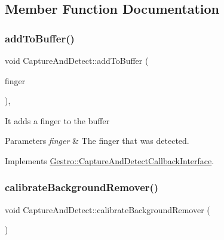 \subsection{Member Function Documentation}
\mbox{\label{classGestro_1_1CaptureAndDetect_af376ab5418f7b235ee181d574da71fd6}} 
\subsubsection{\texorpdfstring{add\+To\+Buffer()}{addToBuffer()}}
{\footnotesize\ttfamily void Capture\+And\+Detect\+::add\+To\+Buffer (\begin{DoxyParamCaption}\item[{\hyperlink{classGestureDetection_1_1FingerAndCoordinates}{Finger\+And\+Coordinates}}]{finger }\end{DoxyParamCaption})\hspace{0.3cm}{\ttfamily [override]}, {\ttfamily [virtual]}}

It adds a finger to the buffer


\begin{DoxyParams}{Parameters}
{\em finger} & The finger that was detected. \\
\hline
\end{DoxyParams}


Implements \hyperlink{classGestro_1_1CaptureAndDetectCallbackInterface_a8397891f6177ba6257e9cc978d9ddd52}{Gestro\+::\+Capture\+And\+Detect\+Callback\+Interface}.

\mbox{\label{classGestro_1_1CaptureAndDetect_a53065abfb6eed6c074ad4d3370b3f232}} 
\subsubsection{\texorpdfstring{calibrate\+Background\+Remover()}{calibrateBackgroundRemover()}}
{\footnotesize\ttfamily void Capture\+And\+Detect\+::calibrate\+Background\+Remover (\begin{DoxyParamCaption}{ }\end{DoxyParamCaption})}

